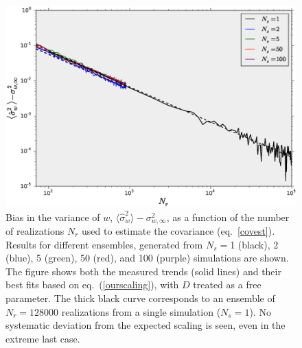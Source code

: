\documentclass[reprint,aps,prd,superscriptaddress,showkeys,showpacs]{revtex4-1}
\newcommand{\h}[1]{\hat{#1}}
\begin{document}
\begin{figure}
\includegraphics[scale=0.3]{Figures/scaling_nr.eps}
\caption{Bias in the variance of $w$,
  $\langle\h{\sigma}^2_w\rangle-\sigma^2_{w,\infty}$, as a function of
  the number of realizations $N_r$ used to estimate the covariance
  (eq.~\ref{covest}). Results for different ensembles, generated from
  $N_s=$1 (black), 2 (blue), 5 (green), 50 (red), and 100 (purple)
  simulations are shown. The figure shows both the measured trends
  (solid lines) and their best fits based on eq.~(\ref{ourscaling}),
  with $D$ treated as a free parameter.  The thick black curve
  corresponds to an ensemble of $N_r=128000$ realizations from a
  single simulation ($N_s=1$).  No systematic deviation from the
  expected scaling is seen, even in the extreme last case.  }
\label{wvar_nr}
\end{figure}
\end{document}
